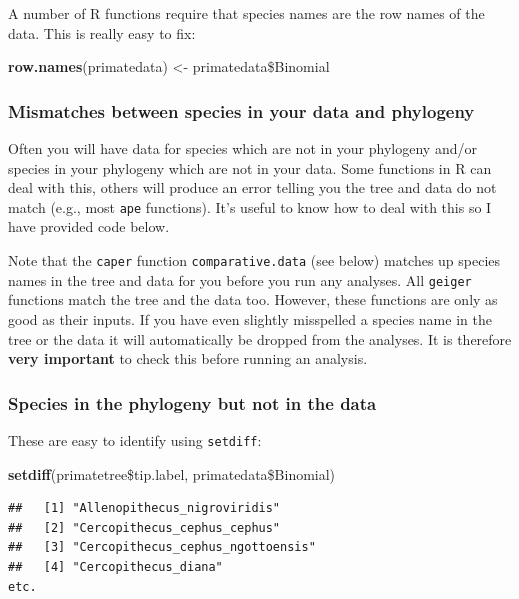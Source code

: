 \documentclass[12pt]{article}
\newcommand{\KeywordTok}[1]{\textcolor[rgb]{0.13,0.29,0.53}{\textbf{{#1}}}}
\newcommand{\StringTok}[1]{\textcolor[rgb]{0.31,0.60,0.02}{{#1}}}
\newcommand{\NormalTok}[1]{{#1}}
\begin{document}
A number of R functions require that species names are the row names of the data. This is really easy to fix:

\begin{snugshade}
\begin{Highlighting}[]
\KeywordTok{row.names}\NormalTok{(primatedata) <-}\StringTok{ }\NormalTok{primatedata\$Binomial}
\end{Highlighting}
\end{snugshade}

\subsubsection{Mismatches between species in your data and phylogeny}
Often you will have data for species which are not in your phylogeny and/or species in your phylogeny which are not in your data. Some functions in R can deal with this, others will produce an error telling you the tree and data do not match (e.g., most \texttt{ape} functions). It's useful to know how to deal with this so I have provided code below.

\begin{framed}
Note that the \texttt{caper} function \texttt{comparative.data} (see below) matches up species names in the tree and data for you before you run any analyses. All \texttt{geiger} functions match the tree and the data too. However, these functions are only as good as their inputs. If you have even slightly misspelled a species name in the tree or the data it will automatically be dropped from the analyses. It is therefore \textbf{very important} to check this before running an analysis.
\end{framed}

\subsubsection{Species in the phylogeny but not in the data}
These are easy to identify using \texttt{setdiff}:

\begin{snugshade}
\begin{Highlighting}[]
\KeywordTok{setdiff}\NormalTok{(primatetree\$tip.label, primatedata\$Binomial)}
\end{Highlighting}
\end{snugshade}

\begin{verbatim}
##   [1] "Allenopithecus_nigroviridis"                  
##   [2] "Cercopithecus_cephus_cephus"                  
##   [3] "Cercopithecus_cephus_ngottoensis"             
##   [4] "Cercopithecus_diana" 
etc.
\end{verbatim}
\end{document}
